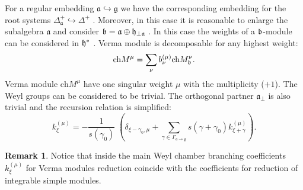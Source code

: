 \documentclass[12pt]{article}
\theoremstyle{definition}
\newtheorem{remark}{Remark}
\newcommand{\gf}{\mathfrak{g}}
\newcommand{\af}{\mathfrak{a}}
\newcommand{\afb}{\mathfrak{a}_{\bot}}
\begin{document}
For a regular embedding $\af\hookrightarrow \gf$ we have the
corresponding embedding for the root systems $\Delta _{\mathfrak{a}%
}^{+}\hookrightarrow \Delta ^{+}$ . Moreover, in this case it is reasonable
to enlarge the subalgebra $\af$ and consider $\frak{b}=\af\oplus
\frak{h}_{\perp \af}$ . In this case the weights of a $\frak{b}$-module
can be considered in $\frak{h}^{\ast }$ . Verma module is decomposable for
any highest weight:
\begin{equation}
\mathrm{ch}M^{\mu }=\sum_{\nu }b_{\nu }^{(\mu )}\mathrm{ch}M_{\frak{b}}^{\nu
}.
\end{equation}
Verma module $\mathrm{ch}M^{\mu }$ have one singular weight $\mu $ with the
multiplicity ($+1$). The Weyl groups can be considered to be trivial. The
orthogonal partner $\afb$ is also trivial and the recursion
relation is simplified:
\begin{equation*}
k_{\xi }^{\left( \mu \right) }=-\frac{1}{s\left( \gamma _{0}\right) }%
\;\left( \delta _{\xi -\gamma _{0},\mu }+\sum_{\gamma \in \Gamma _{\af%
\rightarrow \gf}}s\left( \gamma +\gamma _{0}\right) k_{\xi +\gamma
}^{\left( \mu \right) }\right) .
\end{equation*}

\begin{remark}
Notice that inside the main Weyl chamber branching coefficients $k_{\xi
}^{\left( \mu \right) }$ for Verma modules reduction coincide with the
coefficients for reduction of integrable simple modules.
\end{remark}
\end{document}
